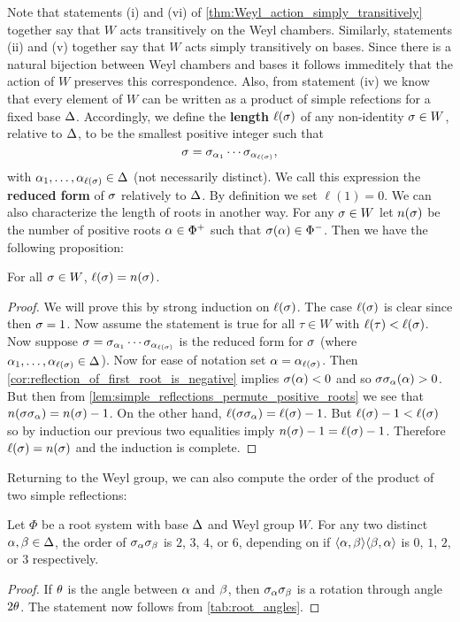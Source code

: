 \documentclass[12pt,reqno,oneside]{amsart}
\begin{document}
    Note that statements (i) and (vi) of \cref{thm:Weyl_action_simply_transitively} together say that $W$ acts transitively on the Weyl chambers. Similarly, statements (ii) and (v) together say that $W$ acts simply transitively on bases. Since there is a natural bijection between Weyl chambers and bases it follows immeditely that the action of $W$ preserves this correspondence. Also, from statement (iv) we know that every element of $W$ can be written as a product of simple refections for a fixed base $\Delta$. Accordingly, we define the \textbf{length} $\ell(\sigma)$ of any non-identity $\sigma \in W$, relative to $\Delta$, to be the smallest positive integer such that
    \[
        \sigma = \sigma_{\alpha_{1}} \cdots \sigma_{\alpha_{\ell(\sigma)}},
    \]
    with $\alpha_{1},\ldots,\alpha_{\ell(\sigma)} \in \Delta$ (not necessarily distinct). We call this expression the \textbf{reduced form} of $\sigma$ relatively to $\Delta$. By definition we set $\ell(1) = 0$. We can also characterize the length of roots in another way. For any $\sigma \in W$ let $n(\sigma)$ be the number of positive roots $\alpha \in \Phi^{+}$ such that $\sigma(\alpha) \in \Phi^{-}$. Then we have the following proposition:

    \begin{proposition}
        For all $\sigma \in W$, $\ell(\sigma) = n(\sigma)$.
    \end{proposition}
    \begin{proof}
        We will prove this by strong induction on $\ell(\sigma)$. The case $\ell(\sigma)$ is clear since then $\sigma = 1$. Now assume the statement is true for all $\tau \in W$ with $\ell(\tau) < \ell(\sigma)$. Now suppose $\sigma = \sigma_{\alpha_{1}} \cdots \sigma_{\alpha_{\ell(\sigma)}}$ is the reduced form for $\sigma$ (where $\alpha_{1},\ldots,\alpha_{\ell(\sigma)} \in \Delta$). Now for ease of notation set $\alpha = \alpha_{\ell(\sigma)}$. Then \cref{cor:reflection_of_first_root_is_negative} implies $\sigma(\alpha) < 0$ and so $\sigma\sigma_{\alpha}(\alpha) > 0$. But then from \cref{lem:simple_reflections_permute_positive_roots} we see that $n(\sigma\sigma_{\alpha}) = n(\sigma)-1$. On the other hand, $\ell(\sigma\sigma_{\alpha}) = \ell(\sigma)-1$. But $\ell(\sigma)-1 < \ell(\sigma)$ so by induction our previous two equalities imply $n(\sigma)-1 = \ell(\sigma)-1$. Therefore $\ell(\sigma) = n(\sigma)$ and the induction is complete.
    \end{proof}

    Returning to the Weyl group, we can also compute the order of the product of two simple reflections:

    \begin{proposition}\label{prop:order_of_product_of_simple_reflections}
        Let $\Phi$ be a root system with base $\Delta$ and Weyl group $W$. For any two distinct $\alpha,\beta \in \Delta$, the order of $\sigma_{\alpha}\sigma_{\beta}$ is $2$, $3$, $4$, or $6$, depending on if $\langle\alpha,\beta\rangle\langle\beta,\alpha\rangle$ is $0$, $1$, $2$, or $3$ respectively. 
    \end{proposition}
    \begin{proof}
        If $\theta$ is the angle between $\alpha$ and $\beta$, then $\sigma_{\alpha}\sigma_{\beta}$ is a rotation through angle $2\theta$. The statement now follows from \cref{tab:root_angles}.
    \end{proof}
\end{document}
